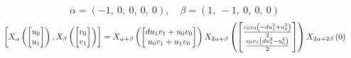 \documentclass[11pt]{article}
\theoremstyle{definition}
\begin{document}
\[
\alpha = \left( -1, \  0, \  0, \  0, \  0\right), \quad \beta = \left( 1, \  -1, \  0, \  0, \  0\right)
\]
\[
\scaletoalign{\textwidth}{\left[ X_{\alpha}\left(\left[\begin{matrix}u_{0}\\u_{1}\end{matrix}\right]\right), X_{\beta}\left(\left[\begin{matrix}v_{0}\\v_{1}\end{matrix}\right]\right) \right] = X_{\alpha + \beta}\left(\left[\begin{matrix}d u_{1} v_{1} + u_{0} v_{0}\\u_{0} v_{1} + u_{1} v_{0}\end{matrix}\right]\right) X_{2\alpha + \beta}\left(\left[\begin{matrix}\frac{c_{0} v_{0} \left(- d u_{1}^{2} + u_{0}^{2}\right)}{2}\\\frac{c_{0} v_{1} \left(d u_{1}^{2} - u_{0}^{2}\right)}{2}\end{matrix}\right]\right) X_{2\alpha + 2\beta}\left(0\right)}
\]
\end{document}
